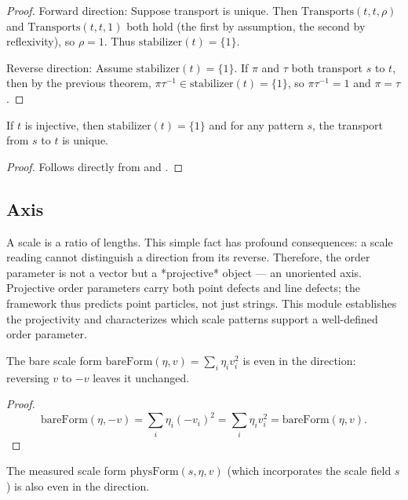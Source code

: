 \begin{proof}
Forward direction: Suppose transport is unique. Then $\mathrm{Transports}(t, t, \rho)$ and $\mathrm{Transports}(t, t, 1)$ both hold (the first by assumption, the second by reflexivity), so $\rho = 1$. Thus $\mathrm{stabilizer}(t) = \{1\}$.

Reverse direction: Assume $\mathrm{stabilizer}(t) = \{1\}$. If $\pi$ and $\tau$ both transport $s$ to $t$, then by the previous theorem, $\pi \tau^{-1} \in \mathrm{stabilizer}(t) = \{1\}$, so $\pi \tau^{-1} = 1$ and $\pi = \tau$.
\end{proof}

\begin{theorem}
If $t$ is injective, then $\mathrm{stabilizer}(t) = \{1\}$ and for any pattern $s$, the transport from $s$ to $t$ is unique.
\end{theorem}

\begin{proof}
Follows directly from  and .
\end{proof}

\subsection{Axis}

A scale is a ratio of lengths. This simple fact has profound consequences: a scale reading cannot distinguish a direction from its reverse. Therefore, the order parameter is not a vector but a *projective* object — an unoriented axis. Projective order parameters carry both point defects and line defects; the framework thus predicts point particles, not just strings. This module establishes the projectivity and characterizes which scale patterns support a well-defined order parameter.

\begin{theorem}
The bare scale form $\mathrm{bareForm}(\eta, v) = \sum_i \eta_i v_i^2$ is even in the direction: reversing $v$ to $-v$ leaves it unchanged.
\end{theorem}

\begin{proof}
\[ \mathrm{bareForm}(\eta, -v) = \sum_i \eta_i (-v_i)^2 = \sum_i \eta_i v_i^2 = \mathrm{bareForm}(\eta, v). \]
\end{proof}

\begin{theorem}
The measured scale form $\mathrm{physForm}(s, \eta, v)$ (which incorporates the scale field $s$) is also even in the direction.
\end{theorem}

